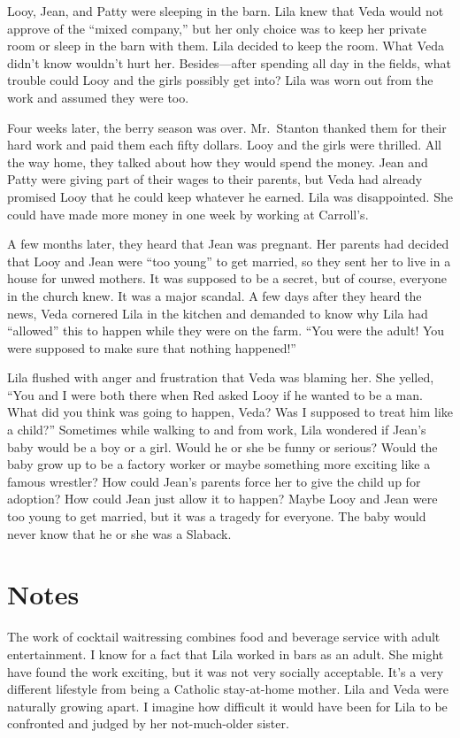 \documentclass[
  letterpaper,
]{book}
\begin{document}
Looy, Jean, and Patty were sleeping in the barn. Lila knew that Veda
would not approve of the ``mixed company,'' but her only choice was to
keep her private room or sleep in the barn with them. Lila decided to
keep the room. What Veda didn't know wouldn't hurt her. Besides---after
spending all day in the fields, what trouble could Looy and the girls
possibly get into? Lila was worn out from the work and assumed they were
too.

Four weeks later, the berry season was over. Mr.~Stanton thanked them
for their hard work and paid them each fifty dollars. Looy and the girls
were thrilled. All the way home, they talked about how they would spend
the money. Jean and Patty were giving part of their wages to their
parents, but Veda had already promised Looy that he could keep whatever
he earned. Lila was disappointed. She could have made more money in one
week by working at Carroll's.

A few months later, they heard that Jean was pregnant. Her parents had
decided that Looy and Jean were ``too young'' to get married, so they
sent her to live in a house for unwed mothers. It was supposed to be a
secret, but of course, everyone in the church knew. It was a major
scandal. A few days after they heard the news, Veda cornered Lila in the
kitchen and demanded to know why Lila had ``allowed'' this to happen
while they were on the farm. ``You were the adult! You were supposed to
make sure that nothing happened!''

Lila flushed with anger and frustration that Veda was blaming her. She
yelled, ``You and I were both there when Red asked Looy if he wanted to
be a man. What did you think was going to happen, Veda? Was I supposed
to treat him like a child?'' Sometimes while walking to and from work,
Lila wondered if Jean's baby would be a boy or a girl. Would he or she
be funny or serious? Would the baby grow up to be a factory worker or
maybe something more exciting like a famous wrestler? How could Jean's
parents force her to give the child up for adoption? How could Jean just
allow it to happen? Maybe Looy and Jean were too young to get married,
but it was a tragedy for everyone. The baby would never know that he or
she was a Slaback.

\section{Notes}\label{notes-29}

The work of cocktail waitressing combines food and beverage service with
adult entertainment. I know for a fact that Lila worked in bars as an
adult. She might have found the work exciting, but it was not very
socially acceptable. It's a very different lifestyle from being a
Catholic stay-at-home mother. Lila and Veda were naturally growing
apart. I imagine how difficult it would have been for Lila to be
confronted and judged by her not-much-older sister.
\end{document}

